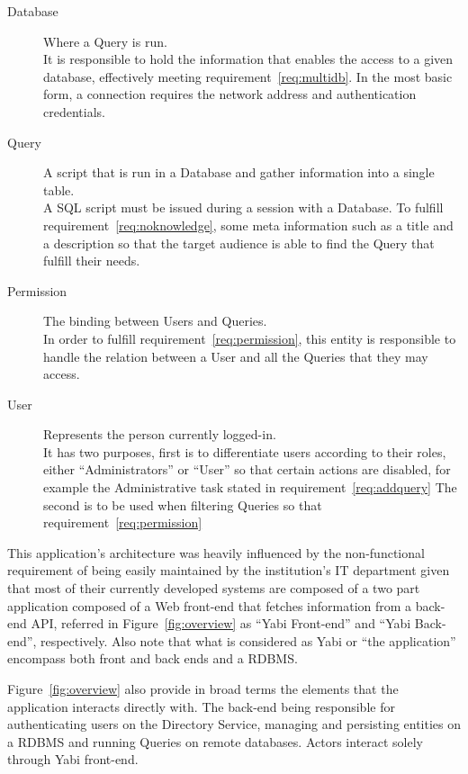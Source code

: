 \begin{description}
\item[Database] Where a Query is run.\\
  It is responsible to hold the information that enables the access to a given database, effectively meeting requirement~\ref{req:multidb}.
  In the most basic form, a connection requires the network address and authentication credentials.
\item[Query] A script that is run in a Database and gather information into a single table.\\
  A \gls{SQL} script must be issued during a session with a Database.
  To fulfill requirement~\ref{req:noknowledge}, some meta information such as a title and a description so that the target audience is able to find the Query that fulfill their needs.
\item[Permission] The binding between Users and Queries.\\
  In order to fulfill requirement~\ref{req:permission}, this entity is responsible to handle the relation between a User and all the Queries that they may access.
\item[User] Represents the person currently logged-in.\\
  It has two purposes, first is to differentiate users according to their roles, either ``Administrators'' or ``User'' so that certain actions are disabled, for example the Administrative task stated in requirement~\ref{req:addquery}
  The second is to be used when filtering Queries so that requirement~\ref{req:permission}
\end{description}

This application's architecture was heavily influenced by the non-functional requirement of being easily maintained by the institution's \gls{IT} department given that most of their currently developed systems are composed of a two part application composed of a Web front-end that fetches information from a back-end \gls{API}, referred in Figure~\ref{fig:overview} as ``\gls{Yabi} Front-end'' and ``Yabi Back-end'', respectively.
Also note that what is considered as \gls{Yabi} or ``the application'' encompass both front and back ends and a \gls{RDBMS}.

Figure~\ref{fig:overview} also provide in broad terms the elements that the application interacts directly with. The back-end being responsible for authenticating users on the Directory Service, managing and persisting entities on a \gls{RDBMS} and running Queries on remote databases. Actors interact solely through \gls{Yabi} front-end.

